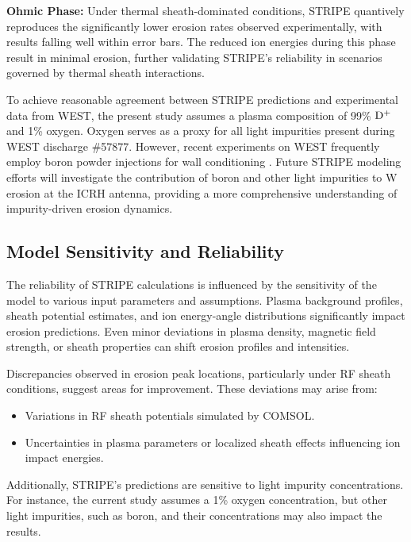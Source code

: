 \documentclass[10pt]{iopart}
\begin{document}
\textbf{Ohmic Phase:} Under thermal sheath-dominated conditions, STRIPE quantively reproduces the significantly lower erosion rates observed experimentally, with results falling well within error bars. The reduced ion energies during this phase result in minimal erosion, further validating STRIPE's reliability in scenarios governed by thermal sheath interactions.

To achieve reasonable agreement between STRIPE predictions and experimental data from WEST, the present study assumes a plasma composition of 99\% $\rm D^+$ and 1\% oxygen. Oxygen serves as a proxy for all light impurities present during WEST discharge \#57877. However, recent experiments on WEST frequently employ boron powder injections for wall conditioning \cite{Bodner:2022, Afonin:2024}. Future STRIPE modeling efforts will investigate the contribution of boron and other light impurities to W erosion at the ICRH antenna, providing a more comprehensive understanding of impurity-driven erosion dynamics.

\subsection{Model Sensitivity and Reliability}
\label{subssec:74}

The reliability of STRIPE calculations is influenced by the sensitivity of the model to various input parameters and assumptions. Plasma background profiles, sheath potential estimates, and ion energy-angle distributions significantly impact erosion predictions. Even minor deviations in plasma density, magnetic field strength, or sheath properties can shift erosion profiles and intensities. 

Discrepancies observed in erosion peak locations, particularly under RF sheath conditions, suggest areas for improvement. These deviations may arise from:

\begin{itemize}
    \item Variations in RF sheath potentials simulated by COMSOL.
    \item Uncertainties in plasma parameters or localized sheath effects influencing ion impact energies.
\end{itemize}

Additionally, STRIPE’s predictions are sensitive to light impurity concentrations. For instance, the current study assumes a 1\% oxygen concentration, but other light impurities, such as boron, and their concentrations may also impact the results.
\end{document}
